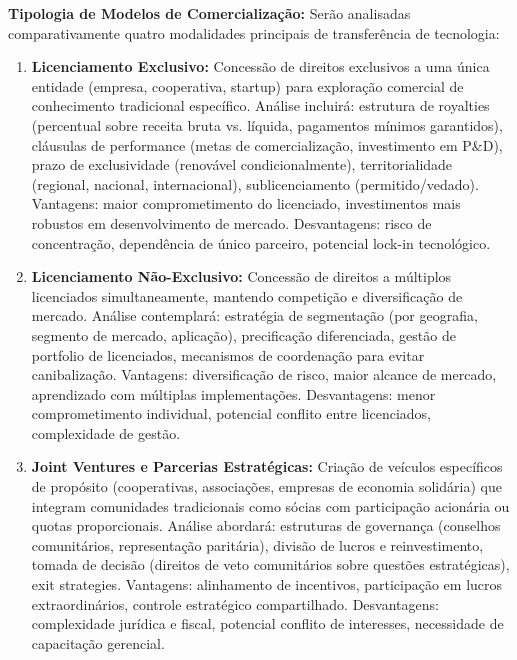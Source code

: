 \textbf{Tipologia de Modelos de Comercialização:} Serão analisadas comparativamente quatro modalidades principais de transferência de tecnologia:

\begin{enumerate}
\item \textbf{Licenciamento Exclusivo:} Concessão de direitos exclusivos a uma única entidade (empresa, cooperativa, startup) para exploração comercial de conhecimento tradicional específico. Análise incluirá: estrutura de royalties (percentual sobre receita bruta vs. líquida, pagamentos mínimos garantidos), cláusulas de performance (metas de comercialização, investimento em P\&D), prazo de exclusividade (renovável condicionalmente), territorialidade (regional, nacional, internacional), sublicenciamento (permitido/vedado). Vantagens: maior comprometimento do licenciado, investimentos mais robustos em desenvolvimento de mercado. Desvantagens: risco de concentração, dependência de único parceiro, potencial lock-in tecnológico.

\item \textbf{Licenciamento Não-Exclusivo:} Concessão de direitos a múltiplos licenciados simultaneamente, mantendo competição e diversificação de mercado. Análise contemplará: estratégia de segmentação (por geografia, segmento de mercado, aplicação), precificação diferenciada, gestão de portfolio de licenciados, mecanismos de coordenação para evitar canibalização. Vantagens: diversificação de risco, maior alcance de mercado, aprendizado com múltiplas implementações. Desvantagens: menor comprometimento individual, potencial conflito entre licenciados, complexidade de gestão.

\item \textbf{Joint Ventures e Parcerias Estratégicas:} Criação de veículos específicos de propósito (cooperativas, associações, empresas de economia solidária) que integram comunidades tradicionais como sócias com participação acionária ou quotas proporcionais. Análise abordará: estruturas de governança (conselhos comunitários, representação paritária), divisão de lucros e reinvestimento, tomada de decisão (direitos de veto comunitários sobre questões estratégicas), exit strategies. Vantagens: alinhamento de incentivos, participação em lucros extraordinários, controle estratégico compartilhado. Desvantagens: complexidade jurídica e fiscal, potencial conflito de interesses, necessidade de capacitação gerencial.


\end{enumerate}
